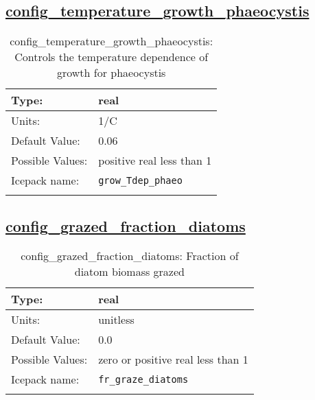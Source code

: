 \subsection[config\_temperature\_growth\_phaeocystis]{\hyperref[sec:nm_tab_biogeochemistry]{config\_temperature\_growth\_phaeocystis}}
\label{subsec:nm_sec_config_temperature_growth_phaeocystis}
\begin{center}
\begin{longtable}{| p{2.0in} || p{4.0in} |}
    \hline
    Type: & real \\
    \hline
    Units: & \si{1/C} \\
    \hline
    Default Value: & 0.06 \\
    \hline
    Possible Values: & positive real less than 1 \\
    \hline
    Icepack name: & \verb+grow_Tdep_phaeo+ \\
    \hline
    \caption{config\_temperature\_growth\_phaeocystis: Controls the temperature dependence of growth for phaeocystis}
\end{longtable}
\end{center}
\subsection[config\_grazed\_fraction\_diatoms]{\hyperref[sec:nm_tab_biogeochemistry]{config\_grazed\_fraction\_diatoms}}
\label{subsec:nm_sec_config_grazed_fraction_diatoms}
\begin{center}
\begin{longtable}{| p{2.0in} || p{4.0in} |}
    \hline
    Type: & real \\
    \hline
    Units: & \si{unitless} \\
    \hline
    Default Value: & 0.0 \\
    \hline
    Possible Values: & zero or positive real less than 1 \\
    \hline
    Icepack name: & \verb+fr_graze_diatoms+ \\
    \hline
    \caption{config\_grazed\_fraction\_diatoms: Fraction of diatom biomass grazed}
\end{longtable}
\end{center}
